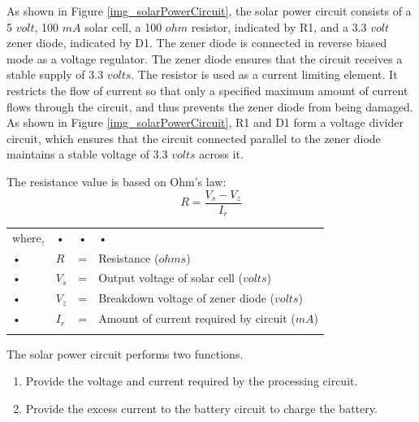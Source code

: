 As shown in Figure \ref{img_solarPowerCircuit}, the solar power circuit consists of a 5 $volt$, 100 $mA$ solar cell, a 100 $ohm$ resistor, indicated by R1, and a 3.3 $volt$ zener diode, indicated by D1. The zener diode is connected in reverse biased mode as a voltage regulator. The zener diode ensures that the circuit receives a stable supply of 3.3 $volts$. The resistor is used as a current limiting element. It restricts the flow of current so that only a specified maximum amount of current flows through the circuit, and thus prevents the zener diode from being damaged. As shown in Figure \ref{img_solarPowerCircuit}, R1 and D1 form a voltage divider circuit, which ensures that the circuit connected parallel to the zener diode maintains a stable voltage of 3.3 $volts$ across it.%

The resistance value is based on Ohm's law:
\begin{equation}
R = \frac{V_{s}-V_{z}}{I_{r}}
\end{equation}






\begin{tabular}{lllp{10cm}}
where, & • & • & • \\ 
• & $R$ & = & Resistance ($ohms$) \\ 
• & $V_{s}$ & = & Output voltage of solar cell ($volts$) \\ 
• & $V_{z}$ & = & Breakdown voltage of zener diode ($volts$) \\ 
• & $I_{r}$ & = & Amount of current required by circuit ($mA$) \\ 
 &  &  &  \\ 
\end{tabular} 


The solar power circuit performs two functions.
\begin{enumerate}
\item Provide the voltage and current required by the processing circuit.
\item Provide the excess current to the battery circuit to charge the battery.
\end{enumerate}

